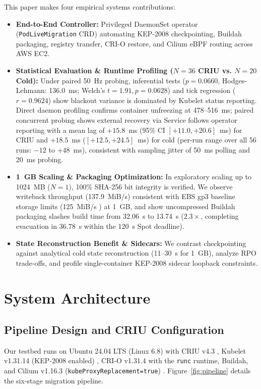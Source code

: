 \documentclass[conference,10pt]{IEEEtran}
\begin{document}
This paper makes four empirical systems contributions:
\begin{itemize}
    \item \textbf{End-to-End Controller:} Privileged DaemonSet operator (\texttt{PodLiveMigration} CRD) automating KEP-2008 checkpointing, Buildah packaging, registry transfer, CRI-O restore, and Cilium eBPF routing across AWS EC2.
    \item \textbf{Statistical Evaluation \& Runtime Profiling ($N = 36$ CRIU vs. $N = 20$ Cold):} Under paired 50~Hz probing, inferential tests ($p = 0.0660$, Hodges-Lehmann: 136.0~ms; Welch's $t = 1.91, p = 0.0628$) and tick regression ($r = 0.9624$) show blackout variance is dominated by Kubelet status reporting. Direct daemon profiling confirms container unfreezing at 478--516~ms; paired concurrent probing shows external recovery via Service follows operator reporting with a mean lag of $+15.8$~ms (95\% CI $[+11.0, +20.6]$~ms) for CRIU and $+18.5$~ms ($[+12.5, +24.5]$~ms) for cold (per-run range over all 56 runs: $-12$ to $+48$~ms), consistent with sampling jitter of 50~ms polling and 20~ms probing.
    \item \textbf{1~GB Scaling \& Packaging Optimization:} In exploratory scaling up to 1024~MB ($N=1$), 100\% SHA-256 bit integrity is verified. We observe writeback throughput (137.9~MiB/s) consistent with EBS gp3 baseline storage limits (125~MiB/s \cite{aws_ebs}) at 1~GB, and show uncompressed Buildah packaging slashes build time from 32.06~s to 13.74~s ($2.3\times$, completing evacuation in 36.78~s within the 120~s Spot deadline).
    \item \textbf{State Reconstruction Benefit \& Sidecars:} We contrast checkpointing against analytical cold state reconstruction (11--30~s for 1~GB), analyze RPO trade-offs, and profile single-container KEP-2008 sidecar loopback constraints.
\end{itemize}

\section{System Architecture}

\subsection{Pipeline Design and CRIU Configuration}
Our testbed runs on Ubuntu 24.04 LTS (Linux 6.8) with CRIU v4.3 \cite{criu}, Kubelet v1.31.14 (KEP-2008 enabled) \cite{reber2022}, CRI-O v1.31.4 with the \texttt{runc} runtime, Buildah, and Cilium v1.16.3 (\texttt{kubeProxyReplacement=true}) \cite{cilium}. Figure~\ref{fig:pipeline} details the six-stage migration pipeline.
\end{document}
